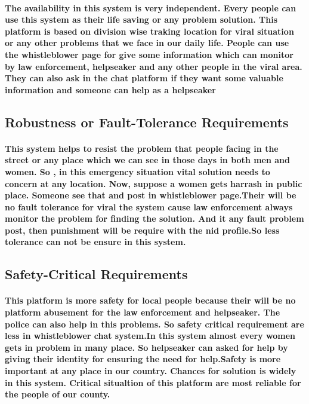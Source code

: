 \documentclass{article}
\begin{document}
\paragraph{The availability in this system is very independent. Every people can use this system as their life saving or any problem solution. This platform is based on division wise traking location for viral situation or any other problems that we face in our daily life. People can use the whistleblower page for give some information which can monitor by law enforcement, helpseaker and any other people in the viral area.
 They can also ask in the chat platform if they want some valuable information and someone can help as a helpseaker}

\newpage
\subsection{Robustness or Fault-Tolerance Requirements }
\paragraph{This system helps to  resist the problem that people facing in the street or any place which we can see in those days in both men and women.
So , in this emergency situation vital solution needs to concern at any location. Now, suppose a women gets harrash in public place. Someone see that and post in whistleblower page.Their will be 
no fault tolerance for viral the system  cause law enforcement always monitor the problem for finding the solution. And it any fault problem post, then punishment will be require with the nid profile.So less tolerance can not be 
ensure in this system.
}

\subsection{Safety-Critical Requirements}
\paragraph{This platform is more safety for local people because their will be no platform abusement for the law enforcement and helpseaker. The police can also help in this problems. So safety critical requirement are less in whistleblower
 chat system.In this system almost every women gets in problem in many place. So helpseaker can asked for help by giving their identity for ensuring the need for help.Safety is more important at any place in our country. Chances for solution is 
widely in this system. Critical situaltion of this platform are most reliable for the people of our county.}
\end{document}
